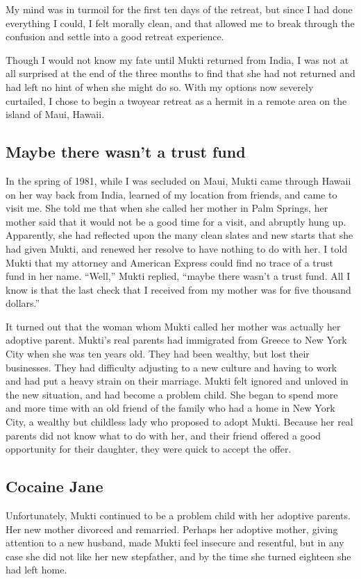 \documentclass[a5paper,10pt,english]{book}
\begin{document}
\sphinxAtStartPar
My mind was in turmoil for the first ten days of the retreat, but since
I had done everything I could, I felt morally clean, and that allowed me
to break through the confusion and settle into a good retreat
experience.

\sphinxAtStartPar
Though I would not know my fate until Mukti returned from India, I was
not at all surprised at the end of the three months to find that she had
not returned and had left no hint of when she might do so. With my
options now severely curtailed, I chose to begin a two\sphinxhyphen{}year retreat as a
hermit in a remote area on the island of Maui, Hawaii.


\subsection{Maybe there wasn’t a trust fund}
\label{\detokenize{psychopaths:maybe-there-wasn-t-a-trust-fund}}
\sphinxAtStartPar
In the spring of 1981, while I was secluded on Maui, Mukti came through
Hawaii on her way back from India, learned of my location from friends,
and came to visit me. She told me that when she called her mother in
Palm Springs, her mother said that it would not be a good time for a
visit, and abruptly hung up. Apparently, she had reflected upon the many
clean slates and new starts that she had given Mukti, and renewed her
resolve to have nothing to do with her. I told Mukti that my attorney
and American Express could find no trace of a trust fund in her name.
“Well,” Mukti replied, “maybe there wasn’t a trust fund. All I know is
that the last check that I received from my mother was for five thousand
dollars.”

\sphinxAtStartPar
It turned out that the woman whom Mukti called her mother was actually
her adoptive parent. Mukti’s real parents had immigrated from Greece to
New York City when she was ten years old. They had been wealthy, but
lost their businesses. They had difficulty adjusting to a new culture
and having to work and had put a heavy strain on their marriage. Mukti
felt ignored and unloved in the new situation, and had become a problem
child. She began to spend more and more time with an old friend of the
family who had a home in New York City, a wealthy but childless lady who
proposed to adopt Mukti. Because her real parents did not know what to
do with her, and their friend offered a good opportunity for their
daughter, they were quick to accept the offer.


\subsection{Cocaine Jane}
\label{\detokenize{psychopaths:cocaine-jane}}
\sphinxAtStartPar
Unfortunately, Mukti continued to be a problem child with her adoptive
parents. Her new mother divorced and remarried. Perhaps her adoptive
mother, giving attention to a new husband, made Mukti feel insecure and
resentful, but in any case she did not like her new stepfather, and by
the time she turned eighteen she had left home.
\end{document}
